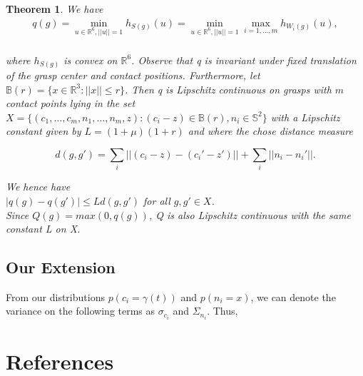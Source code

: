 \documentclass[letterpaper, 10 pt, conference]{ieeeconf}  %
\newtheorem{theorem}{Theorem}
\begin{document}
\begin{theorem}
We have \\

\begin{align}
q(g) = \min_{u\in \mathbb{R}^6, ||u|| =1} h_{S(g)}(u) = \min_{u\in \mathbb{R}^6, ||u|| =1} \max_{i=1,...,m} h_{W_i(g)}(u),\\
\end{align}

where $h_{S(g)}$ is convex on $\mathbb{R}^6$.
Observe that q is invariant under fixed translation of the grasp center and contact positions.
Furthermore, let $\mathbb{B}(r) = \lbrace x \in \mathbb{R}^3 : ||x|| \leq r \rbrace$.
Then q is Lipschitz continuous on grasps with $m$ contact points lying in the set $X = \lbrace (c_1, \dots, c_m,n_1, \dots,n_m,z) : (c_i-z) \in \mathbb{B}(r), n_i \in \mathbb{S}^2 \rbrace$ with a Lipschitz constant given by $L= (1+\mu)(1+r)$ and where the chose distance measure 

\[
  d(g,g') = \sum_i ||(c_i-z)-(c_i'-z')|| + \sum_i ||n_i - n_i'||.
\]

We hence have \\

$|q(g) - q(g')| \leq Ld(g,g')$ for all $g,g' \in X$. \\

Since $Q(g) = max(0,q(g))$, Q is also Lipschitz continuous with the same constant L on X. 
\end{theorem}

\subsection{Our Extension}
From our distributions $p(c_i=\gamma(t))$ and $p(n_i = x)$, we can denote the variance on the following terms as $\sigma_{c_i}$ and $\Sigma_{n_i}$.
Thus, 

\section{References}



\end{document}
